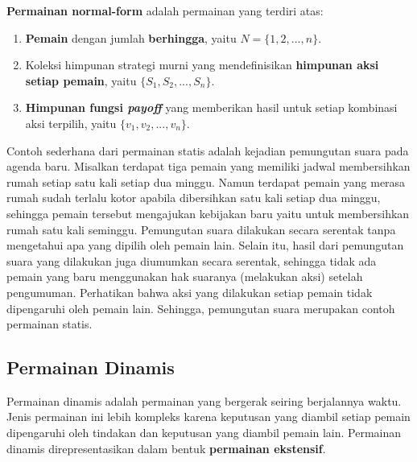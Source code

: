 \begin{definisi}
    \textbf{Permainan normal-form} adalah permainan yang terdiri atas:
    \begin{enumerate}
        \item \textbf{Pemain} dengan jumlah \textbf{berhingga}, yaitu $N = \lbrace 1,2,...,n\rbrace$.
        \item Koleksi himpunan strategi murni yang mendefinisikan \textbf{himpunan aksi setiap pemain}, yaitu $\lbrace S_1, S_2,..., S_n\rbrace$.
        \item \textbf{Himpunan fungsi \textit{payoff}} yang memberikan hasil untuk setiap kombinasi aksi terpilih, yaitu $\lbrace v_1, v_2,...,v_n\rbrace$.
    \end{enumerate}
\end{definisi}

Contoh sederhana dari permainan statis adalah kejadian pemungutan suara pada agenda baru. Misalkan terdapat tiga pemain yang memiliki jadwal membersihkan rumah setiap satu kali setiap dua minggu. Namun terdapat pemain yang merasa rumah sudah terlalu kotor apabila dibersihkan satu kali setiap dua minggu, sehingga pemain tersebut mengajukan kebijakan baru yaitu untuk membersihkan rumah satu kali seminggu. Pemungutan suara dilakukan secara serentak tanpa mengetahui apa yang dipilih oleh pemain lain. Selain itu, hasil dari pemungutan suara yang dilakukan juga diumumkan secara serentak, sehingga tidak ada pemain yang baru menggunakan hak suaranya (melakukan aksi) setelah pengumuman. Perhatikan bahwa aksi yang dilakukan setiap pemain tidak dipengaruhi oleh pemain lain. Sehingga, pemungutan suara merupakan contoh permainan statis.

\subsection{Permainan Dinamis}
Permainan dinamis adalah permainan yang bergerak seiring berjalannya waktu. Jenis permainan ini lebih kompleks karena keputusan yang diambil setiap pemain dipengaruhi oleh tindakan dan keputusan yang diambil pemain lain. Permainan dinamis direpresentasikan dalam bentuk \textbf{permainan ekstensif}.

